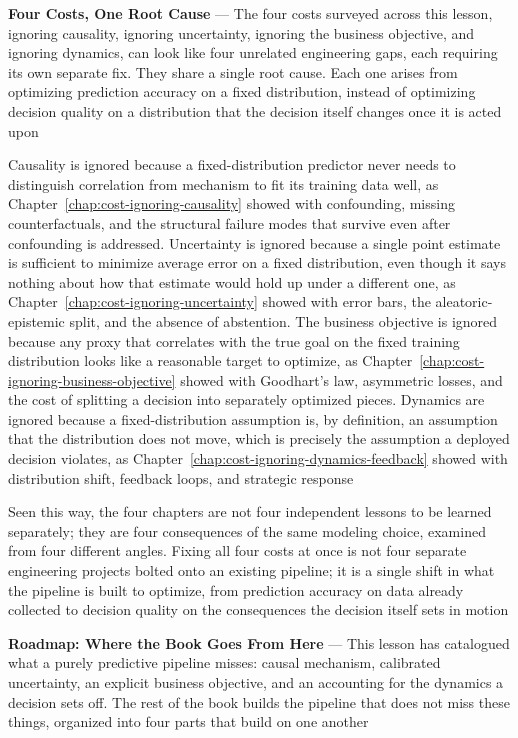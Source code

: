 \textbf{Four Costs, One Root Cause} --- The four costs surveyed across this
lesson, ignoring causality, ignoring uncertainty, ignoring the business objective,
and ignoring dynamics, can look like four unrelated engineering gaps, each
requiring its own separate fix. They share a single root cause. Each one arises
from optimizing prediction accuracy on a fixed distribution, instead of optimizing
decision quality on a distribution that the decision itself changes once it is acted
upon

Causality is ignored because a fixed-distribution predictor never needs to
distinguish correlation from mechanism to fit its training data well, as Chapter~\ref{chap:cost-ignoring-causality}
showed with confounding, missing counterfactuals, and the structural failure modes
that survive even after confounding is addressed. Uncertainty is ignored because
a single point estimate is sufficient to minimize average error on a fixed
distribution, even though it says nothing about how that estimate would hold up under
a different one, as Chapter~\ref{chap:cost-ignoring-uncertainty} showed with
error bars, the aleatoric-epistemic split, and the absence of abstention. The business
objective is ignored because any proxy that correlates with the true goal on the
fixed training distribution looks like a reasonable target to optimize, as
Chapter~\ref{chap:cost-ignoring-business-objective} showed with Goodhart's law, asymmetric
losses, and the cost of splitting a decision into separately optimized pieces. Dynamics
are ignored because a fixed-distribution assumption is, by definition, an assumption
that the distribution does not move, which is precisely the assumption a
deployed decision violates, as Chapter~\ref{chap:cost-ignoring-dynamics-feedback}
showed with distribution shift, feedback loops, and strategic response

Seen this way, the four chapters are not four independent lessons to be learned separately;
they are four consequences of the same modeling choice, examined from four different
angles. Fixing all four costs at once is not four separate engineering projects
bolted onto an existing pipeline; it is a single shift in what the pipeline is built
to optimize, from prediction accuracy on data already collected to decision
quality on the consequences the decision itself sets in motion

\textbf{Roadmap: Where the Book Goes From Here} --- This lesson has catalogued
what a purely predictive pipeline misses: causal mechanism, calibrated
uncertainty, an explicit business objective, and an accounting for the dynamics
a decision sets off. The rest of the book builds the pipeline that does not miss
these things, organized into four parts that build on one another

